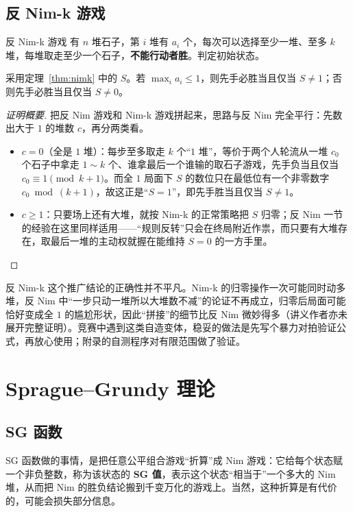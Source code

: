 \section{反 Nim-k 游戏}
\begin{problem}{反 Nim-k 游戏}
有 $n$ 堆石子，第 $i$ 堆有 $a_i$ 个，每次可以选择至少一堆、至多 $k$ 堆，每堆取走至少一个石子，\textbf{不能行动者胜}。判定初始状态。
\end{problem}

\begin{theorem}[反 Nim-k 判定]\label{thm:antinimk}
采用定理~\ref{thm:nimk} 中的 $S$。若 $\max_i a_i\le1$，则先手必胜当且仅当 $S\ne1$；否则先手必胜当且仅当 $S\ne0$。
\end{theorem}
\begin{proof}[证明概要]
把反 Nim 游戏和 Nim-k 游戏拼起来，思路与反 Nim 完全平行：先数出大于 $1$ 的堆数 $c$，再分两类看。
\begin{itemize}
\item $c=0$（全是 $1$ 堆）：每步至多取走 $k$ 个“$1$ 堆”，等价于两个人轮流从一堆 $c_0$ 个石子中拿走 $1\sim k$ 个、谁拿最后一个谁输的取石子游戏，先手负当且仅当 $c_0\equiv1\pmod{k+1}$。而全 $1$ 局面下 $S$ 的数位只在最低位有一个非零数字 $c_0\bmod(k+1)$，故这正是“$S=1$”，即先手胜当且仅当 $S\ne1$。
\item $c\ge1$：只要场上还有大堆，就按 Nim-k 的正常策略把 $S$ 归零；反 Nim 一节的经验在这里同样适用——“规则反转”只会在终局附近作祟，而只要有大堆存在，取最后一堆的主动权就握在能维持 $S=0$ 的一方手里。
\end{itemize}
\end{proof}

\begin{pitfall}[自造变体先对拍]
反 Nim-k 这个推广结论的正确性并不平凡。Nim-k 的归零操作一次可能同时动多堆，反 Nim 中“一步只动一堆所以大堆数不减”的论证不再成立，归零后局面可能恰好变成全 $1$ 的尴尬形状，因此“拼接”的细节比反 Nim 微妙得多（讲义作者亦未展开完整证明）。竞赛中遇到这类自造变体，稳妥的做法是先写个暴力对拍验证公式，再放心使用；附录的自测程序对有限范围做了验证。
\end{pitfall}

\chapter{Sprague--Grundy 理论}
\section{SG 函数}
SG 函数做的事情，是把任意公平组合游戏“折算”成 Nim 游戏：它给每个状态赋一个非负整数，称为该状态的 \textbf{SG 值}，表示这个状态“相当于”一个多大的 Nim 堆，从而把 Nim 的胜负结论搬到千变万化的游戏上。当然，这种折算是有代价的，可能会损失部分信息。

